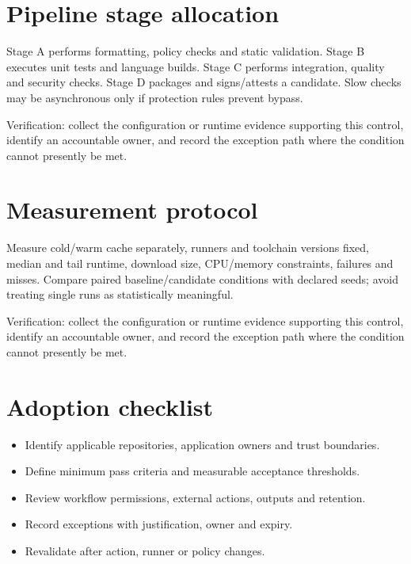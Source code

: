 \documentclass[11pt,letterpaper]{article}
\begin{document}
\section{Pipeline stage allocation}
Stage A performs formatting, policy checks and static validation. Stage B executes unit tests and language builds. Stage C performs integration, quality and security checks. Stage D packages and signs/attests a candidate. Slow checks may be asynchronous only if protection rules prevent bypass.

Verification: collect the configuration or runtime evidence supporting this control, identify an accountable owner, and record the exception path where the condition cannot presently be met.

\section{Measurement protocol}
Measure cold/warm cache separately, runners and toolchain versions fixed, median and tail runtime, download size, CPU/memory constraints, failures and misses. Compare paired baseline/candidate conditions with declared seeds; avoid treating single runs as statistically meaningful.

Verification: collect the configuration or runtime evidence supporting this control, identify an accountable owner, and record the exception path where the condition cannot presently be met.

\section{Adoption checklist}
\begin{itemize}
\item Identify applicable repositories, application owners and trust boundaries.
\item Define minimum pass criteria and measurable acceptance thresholds.
\item Review workflow permissions, external actions, outputs and retention.
\item Record exceptions with justification, owner and expiry.
\item Revalidate after action, runner or policy changes.
\end{itemize}
\end{document}

